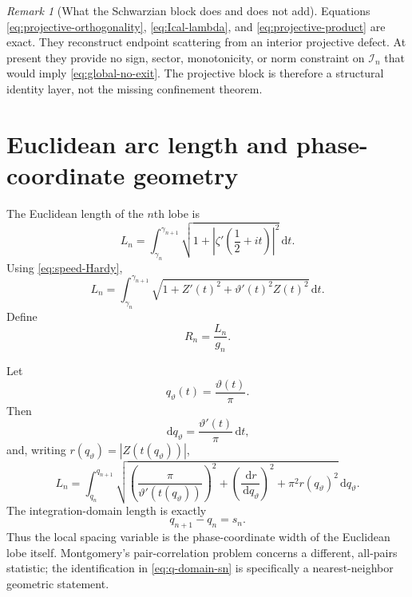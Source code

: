 \documentclass[11pt]{amsart}
\numberwithin{equation}{section}
\theoremstyle{definition}
\theoremstyle{remark}
\newtheorem{remark}[theorem]{Remark}
\newcommand{\dd}{\,\mathrm d}
\newcommand{\Ical}{\mathcal I}
\begin{document}
\begin{remark}[What the Schwarzian block does and does not add]
\label{rem:Schwarzian-status}
Equations \eqref{eq:projective-orthogonality}, \eqref{eq:Ical-lambda}, and \eqref{eq:projective-product} are exact.  They reconstruct endpoint scattering from an interior projective defect.  At present they provide no sign, sector, monotonicity, or norm constraint on $\Ical_n$ that would imply \eqref{eq:global-no-exit}.  The projective block is therefore a structural identity layer, not the missing confinement theorem.
\end{remark}

\section{Euclidean arc length and phase-coordinate geometry}
\label{sec:arc-length}

The Euclidean length of the $n$th lobe is
\begin{equation}
L_n
=\int_{\gamma_n}^{\gamma_{n+1}}
\sqrt{1+\left|\zeta'\!\left(\frac12+it\right)\right|^2}\dd t.
\label{eq:Ln-definition}
\end{equation}
Using \eqref{eq:speed-Hardy},
\begin{equation}
L_n
=\int_{\gamma_n}^{\gamma_{n+1}}
\sqrt{1+Z'(t)^2+\vartheta'(t)^2Z(t)^2}\dd t.
\label{eq:Ln-Hardy}
\end{equation}
Define
\begin{equation}
R_n=\frac{L_n}{g_n}.
\label{eq:Rn-definition}
\end{equation}

Let
\begin{equation}
q_\vartheta(t)=\frac{\vartheta(t)}{\pi}.
\label{eq:qtheta}
\end{equation}
Then
\begin{equation}
\dd q_\vartheta=\frac{\vartheta'(t)}{\pi}\dd t,
\label{eq:dqtheta}
\end{equation}
and, writing $r(q_\vartheta)=|Z(t(q_\vartheta))|$,
\begin{equation}
L_n
=\int_{q_n}^{q_{n+1}}
\sqrt{
\left(\frac{\pi}{\vartheta'(t(q_\vartheta))}\right)^2
+\left(\frac{\dd r}{\dd q_\vartheta}\right)^2
+\pi^2r(q_\vartheta)^2
}\dd q_\vartheta.
\label{eq:Ln-phase-coordinate}
\end{equation}
The integration-domain length is exactly
\begin{equation}
q_{n+1}-q_n=s_n.
\label{eq:q-domain-sn}
\end{equation}
Thus the local spacing variable is the phase-coordinate width of the Euclidean lobe itself.  Montgomery's pair-correlation problem \cite{Montgomery1973} concerns a different, all-pairs statistic; the identification in \eqref{eq:q-domain-sn} is specifically a nearest-neighbor geometric statement.
\end{document}
